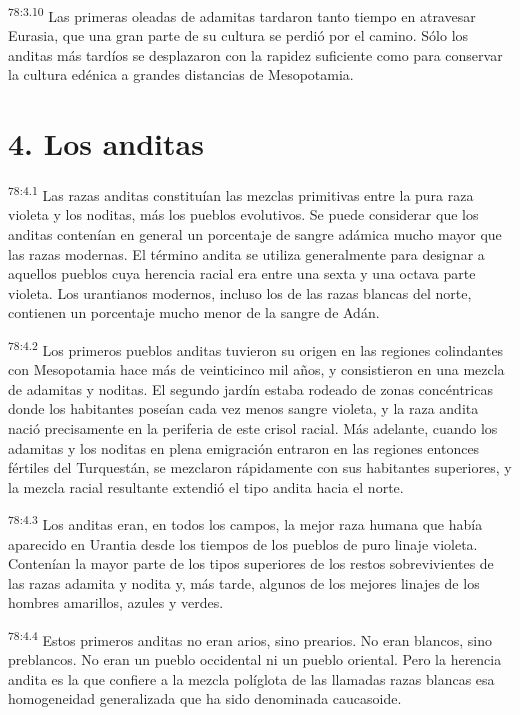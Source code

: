 \par
\textsuperscript{78:3.10} Las primeras oleadas de adamitas tardaron tanto tiempo en atravesar Eurasia, que una gran parte de su cultura se perdió por el camino. Sólo los anditas más tardíos se desplazaron con la rapidez suficiente como para conservar la cultura edénica a grandes distancias de Mesopotamia.

\section*{4. Los anditas}
\par
\textsuperscript{78:4.1} Las razas anditas constituían las mezclas primitivas entre la pura raza violeta y los noditas, más los pueblos evolutivos. Se puede considerar que los anditas contenían en general un porcentaje de sangre adámica mucho mayor que las razas modernas. El término andita se utiliza generalmente para designar a aquellos pueblos cuya herencia racial era entre una sexta y una octava parte violeta. Los urantianos modernos, incluso los de las razas blancas del norte, contienen un porcentaje mucho menor de la sangre de Adán.

\par
\textsuperscript{78:4.2} Los primeros pueblos anditas tuvieron su origen en las regiones colindantes con Mesopotamia hace más de veinticinco mil años, y consistieron en una mezcla de adamitas y noditas. El segundo jardín estaba rodeado de zonas concéntricas donde los habitantes poseían cada vez menos sangre violeta, y la raza andita nació precisamente en la periferia de este crisol racial. Más adelante, cuando los adamitas y los noditas en plena emigración entraron en las regiones entonces fértiles del Turquestán, se mezclaron rápidamente con sus habitantes superiores, y la mezcla racial resultante extendió el tipo andita hacia el norte.

\par
\textsuperscript{78:4.3} Los anditas eran, en todos los campos, la mejor raza humana que había aparecido en Urantia desde los tiempos de los pueblos de puro linaje violeta. Contenían la mayor parte de los tipos superiores de los restos sobrevivientes de las razas adamita y nodita y, más tarde, algunos de los mejores linajes de los hombres amarillos, azules y verdes.

\par
\textsuperscript{78:4.4} Estos primeros anditas no eran arios, sino prearios. No eran blancos, sino preblancos. No eran un pueblo occidental ni un pueblo oriental. Pero la herencia andita es la que confiere a la mezcla políglota de las llamadas razas blancas esa homogeneidad generalizada que ha sido denominada caucasoide.

